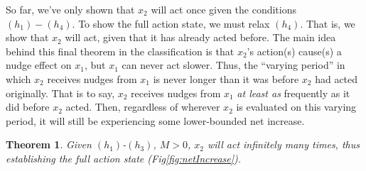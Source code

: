 \documentclass[preprint,12pt]{elsarticle}
\newtheorem{theorem}{Theorem}
\begin{document}
So far, we've only shown that $x_2$ will act once given the conditions $(h_1)-(h_4)$. To show the full action state, we must relax $(h_4)$. That is, we show that $x_2$ will act, given that it has already acted before. The main idea behind this final theorem in the classification is that $x_2$'s action(s) cause(s) a nudge effect on $x_1$, but $x_1$ can never act slower. Thus, the ``varying period'' in which $x_2$ receives nudges from $x_1$ is never longer than it was before $x_2$ had acted originally. That is to say, $x_2$ receives nudges from $x_1$ \textit{at least as} frequently as it did before $x_2$ acted. Then, regardless of wherever $x_2$ is evaluated on this varying period, it will still be experiencing some lower-bounded net increase. 

\begin{theorem}\label{thm:FullAction}
    Given $(h_1)$-$(h_3)$, $M>0$, $x_2$ will act infinitely many times, thus establishing the full action state (Fig\ref{fig:netIncrease}). 
\end{theorem}
\end{document}
